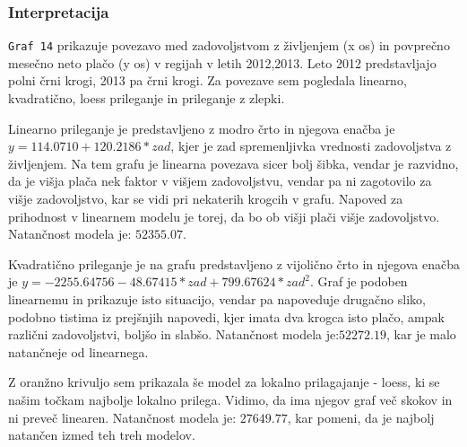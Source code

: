 \documentclass[11pt,a4paper]{article}
\begin{document}
\subsubsection{Interpretacija}
\par \verb+Graf 14+ prikazuje povezavo med zadovoljstvom z življenjem (x os) in povprečno mesečno neto plačo (y os) v regijah v letih 2012,2013. Leto 2012 predstavljajo polni črni krogi, 2013 pa črni krogi. Za povezave sem pogledala linearno, kvadratično, loess prileganje in prileganje z zlepki.
\par Linearno prileganje je predstavljeno z modro črto in njegova enačba je $y=114.0710 + 120.2186*zad$, kjer je zad spremenljivka vrednosti zadovoljstva z življenjem. Na tem grafu je linearna povezava sicer bolj šibka, vendar je razvidno, da je višja plača nek faktor v višjem zadovoljstvu, vendar pa ni zagotovilo za višje zadovoljstvo, kar se vidi pri nekaterih krogcih v grafu. Napoved za prihodnost v linearnem modelu je torej, da bo ob višji plači višje zadovoljstvo. Natančnost modela je: $52355.07$.
\par  Kvadratično prileganje je na grafu predstavljeno z vijolično črto in njegova enačba je $y=-2255.64756 -48.67415*zad + 799.67624*zad^2$. Graf je podoben linearnemu in prikazuje isto situacijo, vendar pa napoveduje drugačno sliko, podobno tistima iz prejšnjih napovedi, kjer imata dva krogca isto plačo, ampak različni zadovoljstvi, boljšo in slabšo. Natančnost modela je:$52272.19$, kar je malo natančneje od linearnega.
\par Z oranžno krivuljo sem prikazala še model za lokalno prilagajanje - loess, ki se našim točkam najbolje lokalno prilega. Vidimo, da ima njegov graf več skokov in ni preveč linearen. Natančnost modela je: $27649.77$, kar pomeni, da je najbolj natančen izmed teh treh modelov.
\end{document}
